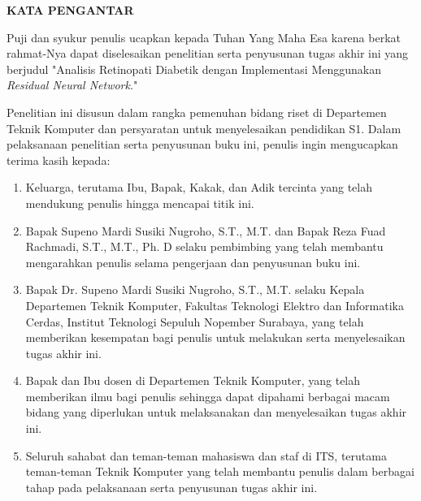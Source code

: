 \begin{center}
  \Large
  \textbf{KATA PENGANTAR}
\end{center}


\vspace{2ex}


Puji dan syukur penulis ucapkan kepada Tuhan Yang Maha Esa karena berkat rahmat-Nya dapat diselesaikan penelitian serta penyusunan tugas akhir ini yang berjudul "Analisis Retinopati Diabetik dengan Implementasi Menggunakan \emph{Residual Neural Network}."

Penelitian ini disusun dalam rangka pemenuhan bidang riset di Departemen Teknik Komputer dan persyaratan untuk menyelesaikan pendidikan S1. Dalam pelaksanaan penelitian serta penyusunan buku ini, penulis ingin mengucapkan terima kasih kepada:

\begin{enumerate}[nolistsep]

  \item Keluarga, terutama Ibu, Bapak, Kakak, dan Adik tercinta yang telah mendukung penulis hingga mencapai titik ini.

  \item Bapak Supeno Mardi Susiki Nugroho, S.T., M.T. dan Bapak Reza Fuad Rachmadi, S.T., M.T., Ph. D selaku pembimbing yang telah membantu mengarahkan penulis selama pengerjaan dan penyusunan buku ini. 

  \item Bapak Dr. Supeno Mardi Susiki Nugroho, S.T., M.T. selaku Kepala Departemen Teknik Komputer, Fakultas Teknologi Elektro dan Informatika Cerdas, Institut Teknologi Sepuluh Nopember Surabaya, yang telah memberikan kesempatan bagi penulis untuk melakukan serta menyelesaikan tugas akhir ini.
  
  \item Bapak dan Ibu dosen di Departemen Teknik Komputer, yang telah memberikan ilmu bagi penulis sehingga dapat dipahami berbagai macam bidang yang diperlukan untuk melaksanakan dan menyelesaikan tugas akhir ini.
  
  \item Seluruh sahabat dan teman-teman mahasiswa dan staf di ITS, terutama teman-teman Teknik Komputer yang telah membantu penulis dalam berbagai tahap pada pelaksanaan serta penyusunan tugas akhir ini.

\end{enumerate}


